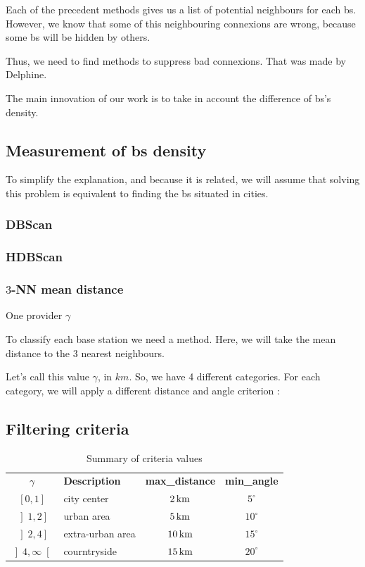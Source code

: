 \documentclass[lettersize,journal,english]{IEEEtran}
\begin{document}
\noindent Each of the precedent methods gives us a list of potential neighbours for each \acrshort{bs}. However, we know that some of this neighbouring connexions are wrong,
because some \acrshort{bs} will be \og hidden\fg{} by others.

Thus, we need to find methods to suppress bad connexions. That was made by Delphine.

The main innovation of our work is to take in account the difference of \acrshort{bs}'s density.

\subsection{Measurement of \acrshort{bs} density}
\noindent To simplify the explanation, and because it is related, we will assume that solving this problem is equivalent to finding the \acrshort{bs} situated in \og cities\fg{}.

\subsubsection{DBScan}

\subsubsection{HDBScan}

\subsubsection{$3$-NN mean distance}
One provider $\gamma$

To classify each base station we need a method. Here, we will take the mean distance to the 3 nearest neighbours.

Let's call this value $\gamma$, in $\unit{km}$. So, we have 4 different categories.
For each category, we will apply a different distance and angle criterion :

\subsection{Filtering criteria}

\begin{table}[!b]
    \centering
    \caption{Summary of criteria values}
    \label{crit_summary}
    \begin{tabular}{clcc}
        \toprule
        \textbf{$\gamma$} & \textbf{Description} & \textbf{max\_distance} & \textbf{min\_angle} \\
        \cmidrule(lr){1-4}
        $\left[0, 1\right]$ & city center & $\unit[2]{km}$ & $5^\circ$ \\
        $\left]1, 2\right]$ & urban area & $\unit[5]{km}$ & $10^\circ$ \\
        $\left]2, 4\right]$ & extra-urban area & $\unit[10]{km}$ & $15^\circ$ \\
        $\left]4, \infty\right[$ & courntryside & $\unit[15]{km}$ & $20^\circ$ \\
        \bottomrule
    \end{tabular}
\end{table}
\end{document}

